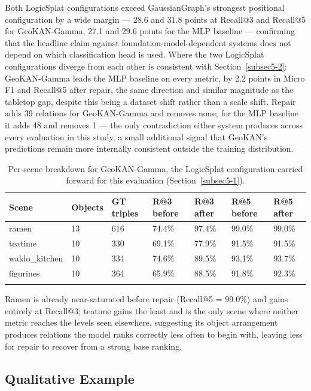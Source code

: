 \documentclass[sn-mathphys,Numbered]{sn-jnl}
\begin{document}
Both LogicSplat configurations exceed GaussianGraph's strongest positional configuration by a wide margin --- 28.6 and 31.8 points at Recall@3 and Recall@5 for GeoKAN-Gamma, 27.1 and 29.6 points for the MLP baseline --- confirming that the headline claim against foundation-model-dependent systems does not depend on which classification head is used. Where the two LogicSplat configurations diverge from each other is consistent with Section~\ref{subsec5-2}: GeoKAN-Gamma leads the MLP baseline on every metric, by 2.2 points in Micro F1 and Recall@5 after repair, the same direction and similar magnitude as the tabletop gap, despite this being a dataset shift rather than a scale shift. Repair adds 39 relations for GeoKAN-Gamma and removes none; for the MLP baseline it adds 48 and removes 1 --- the only contradiction either system produces across every evaluation in this study, a small additional signal that GeoKAN's predictions remain more internally consistent outside the training distribution.

\begin{table}[htbp]
\centering
\caption{Per-scene breakdown for GeoKAN-Gamma, the LogicSplat configuration carried forward for this evaluation (Section~\ref{subsec5-1}).}\label{tab14}
\small
\begin{tabular}{@{}p{1.8cm}p{1.1cm}p{1.3cm}p{1.3cm}p{1.2cm}p{1.3cm}p{1.2cm}@{}}
\toprule
Scene & Objects & GT triples & R@3 before & R@3 after & R@5 before & R@5 after \\
\midrule
ramen & 13 & 616 & 74.4\% & 97.4\% & 99.0\% & 99.0\% \\
\midrule
teatime & 10 & 330 & 69.1\% & 77.9\% & 91.5\% & 91.5\% \\
\midrule
waldo\_kitchen & 10 & 334 & 74.6\% & 89.5\% & 93.1\% & 93.7\% \\
\midrule
figurines & 10 & 364 & 65.9\% & 88.5\% & 91.8\% & 92.3\% \\
\botrule
\end{tabular}
\end{table}

Ramen is already near-saturated before repair (Recall@5 = 99.0\%) and gains entirely at Recall@3; teatime gains the least and is the only scene where neither metric reaches the levels seen elsewhere, suggesting its object arrangement produces relations the model ranks correctly less often to begin with, leaving less for repair to recover from a strong base ranking.

\FloatBarrier
\subsection{Qualitative Example}\label{subsec5-4}
\end{document}
